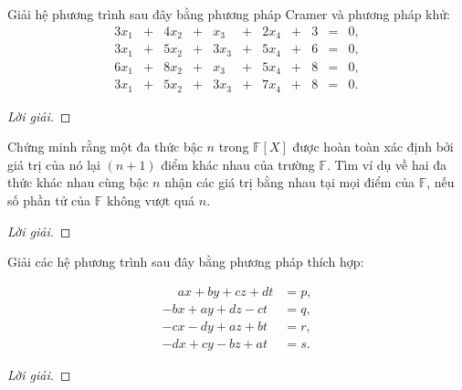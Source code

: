 \documentclass[class=linearalgebra,crop=false]{standalone}
\begin{document}
\begin{exercise}
    \par Giải hệ phương trình sau đây bằng phương pháp Cramer và phương pháp khử:
    \[
        \begin{array}{ccccccccccc}
            3x_{1} & + & 4x_{2} & + & x_{3}  & + & 2x_{4} & + & 3 & = & 0, \\
            3x_{1} & + & 5x_{2} & + & 3x_{3} & + & 5x_{4} & + & 6 & = & 0, \\
            6x_{1} & + & 8x_{2} & + & x_{3}  & + & 5x_{4} & + & 8 & = & 0, \\
            3x_{1} & + & 5x_{2} & + & 3x_{3} & + & 7x_{4} & + & 8 & = & 0.
        \end{array}
    \]
\end{exercise}

\begin{proof}[Lời giải]
\end{proof}

\begin{exercise}
    \par Chứng minh rằng một đa thức bậc $n$ trong $\mathbb{F}[X]$ được hoàn toàn xác định bởi giá trị của nó lại $(n+1)$ điểm khác nhau của trường $\mathbb{F}$. Tìm ví dụ về hai đa thức khác nhau cùng bậc $n$ nhận các giá trị bằng nhau tại mọi điểm của $\mathbb{F}$, nếu số phần tử của $\mathbb{F}$ không vượt quá $n$.
\end{exercise}

\begin{proof}[Lời giải]
\end{proof}

\par Giải các hệ phương trình sau đây bằng phương pháp thích hợp:

\begin{exercise}
    \begin{align*}
        \phantom{-}ax + by + cz + dt & = p, \\
        -bx + ay + dz - ct           & = q, \\
        -cx - dy + az + bt           & = r, \\
        -dx + cy - bz + at           & = s.
    \end{align*}
\end{exercise}

\begin{proof}[Lời giải]
\end{proof}
\end{document}
